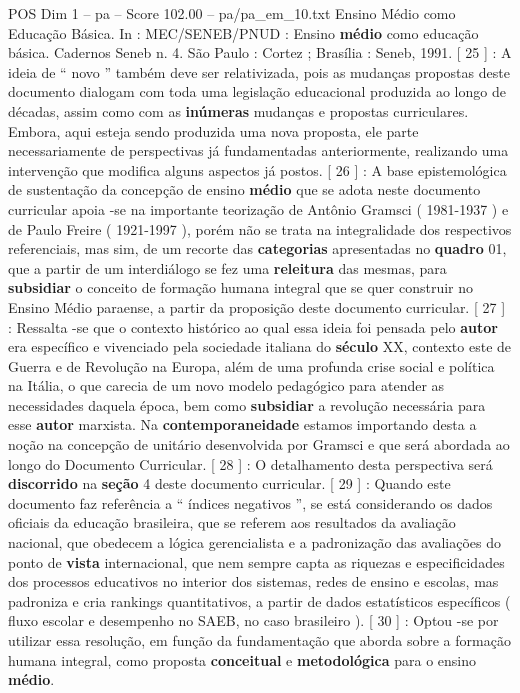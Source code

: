 \begin{textsample}{POS Dim 1 – pa – Score 102.00 – pa/pa\_em\_10.txt}
Ensino Médio como Educação Básica.
In : MEC/SENEB/PNUD : Ensino \textbf{médio} como educação básica.
Cadernos Seneb n. 4.
São Paulo : Cortez ; Brasília : Seneb, 1991. [ 25 ] : A ideia de “ novo ” também deve ser relativizada, pois as mudanças propostas deste documento dialogam com toda uma legislação educacional produzida ao longo de décadas, assim como com as \textbf{inúmeras} mudanças e propostas curriculares.
Embora, aqui esteja sendo produzida uma nova proposta, ele parte necessariamente de perspectivas já fundamentadas anteriormente, realizando uma intervenção que modifica alguns aspectos já postos. [ 26 ] : A base epistemológica de sustentação da concepção de ensino \textbf{médio} que se adota neste documento curricular apoia -se na importante teorização de Antônio Gramsci ( 1981-1937 ) e de Paulo Freire ( 1921-1997 ), porém não se trata na integralidade dos respectivos referenciais, mas sim, de um recorte das \textbf{categorias} apresentadas no \textbf{quadro} 01, que a partir de um interdiálogo se fez uma \textbf{releitura} das mesmas, para \textbf{subsidiar} o conceito de formação humana integral que se quer construir no Ensino Médio paraense, a partir da proposição deste documento curricular. [ 27 ] : Ressalta -se que o contexto histórico ao qual essa ideia foi pensada pelo \textbf{autor} era específico e vivenciado pela sociedade italiana do \textbf{século} XX, contexto este de Guerra e de Revolução na Europa, além de uma profunda crise social e política na Itália, o que carecia de um novo modelo pedagógico para atender as necessidades daquela época, bem como \textbf{subsidiar} a revolução necessária para esse \textbf{autor} marxista.
Na \textbf{contemporaneidade} estamos importando desta a noção na concepção de unitário desenvolvida por Gramsci e que será abordada ao longo do Documento Curricular. [ 28 ] : O detalhamento desta perspectiva será \textbf{discorrido} na \textbf{seção} 4 deste documento curricular. [ 29 ] : Quando este documento faz referência a “ índices negativos ”, se está considerando os dados oficiais da educação brasileira, que se referem aos resultados da avaliação nacional, que obedecem a lógica gerencialista e a padronização das avaliações do ponto de \textbf{vista} internacional, que nem sempre capta as riquezas e especificidades dos processos educativos no interior dos sistemas, redes de ensino e escolas, mas padroniza e cria rankings quantitativos, a partir de dados estatísticos específicos ( fluxo escolar e desempenho no SAEB, no caso brasileiro ). [ 30 ] : Optou -se por utilizar essa resolução, em função da fundamentação que aborda sobre a formação humana integral, como proposta \textbf{conceitual} e \textbf{metodológica} para o ensino \textbf{médio}.

\end{textsample}
